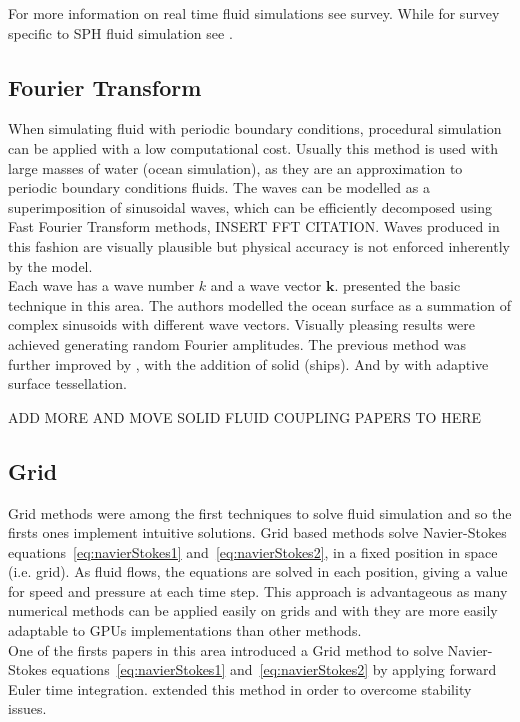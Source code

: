 For more information on real time fluid simulations see \cite{Vines2012} survey.
While for survey specific to SPH fluid simulation see \cite{Ihmsen2014}.

\subsection{Fourier Transform}

When simulating fluid with periodic boundary conditions, procedural simulation can be applied with a low computational cost.
Usually this method is used with large masses of water (ocean simulation), as they are an approximation to periodic boundary conditions fluids.
The waves can be modelled as a superimposition of sinusoidal waves, which can be efficiently decomposed using Fast Fourier Transform methods, INSERT FFT CITATION.
Waves produced in this fashion are visually plausible but physical accuracy is not enforced inherently by the model.\\

Each wave has a wave number $k$ and a wave vector $\mathbf{k}$.
\cite{Tessendorf2001} presented the basic technique in this area.
The authors modelled the ocean surface as a summation of complex sinusoids with different wave vectors.
Visually pleasing results were achieved generating random Fourier amplitudes.
The previous method was further improved by \cite{Cieutat2003}, with the addition of solid (ships).
And by \cite{Chiu2006} with adaptive surface tessellation.


ADD MORE AND MOVE SOLID FLUID COUPLING PAPERS TO HERE

\subsection{Grid}

Grid methods were among the first techniques to solve fluid simulation and so the firsts ones implement intuitive solutions.
Grid based methods solve Navier-Stokes equations~\ref{eq:navierStokes1} and~\ref{eq:navierStokes2}, in a fixed position in space (i.e. grid).
As fluid flows, the equations are solved in each position, giving a value for speed and pressure at each time step.
This approach is advantageous as many numerical methods can be applied easily on grids and with they are more easily adaptable to GPUs implementations than other methods.\\

One of the firsts papers in this area introduced a Grid method \cite{Foster1996} to solve Navier-Stokes equations~\ref{eq:navierStokes1} and~\ref{eq:navierStokes2} by applying forward Euler time integration. 
\cite{Stam1999} extended this method in order to overcome stability issues.\\

